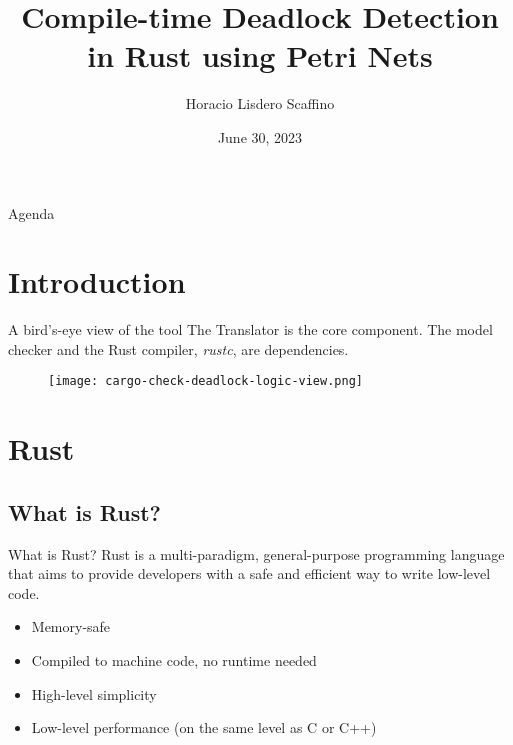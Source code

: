 \documentclass{beamer}
\title[Compile-time Deadlock Detection in Rust]{Compile-time Deadlock Detection \\ in Rust using Petri Nets}
\author{Horacio Lisdero Scaffino}
\institute[FIUBA]{Facultad de Ingeniería\\Universidad de Buenos Aires}
\date{June 30, 2023}
\begin{document}
\begin{frame}
  \titlepage
\end{frame}

\logo{}

\begin{frame}{Agenda}
  \tableofcontents
\end{frame}

\section{Introduction}

\begin{frame}{A bird's-eye view of the tool}
  The Translator is the core component.
  The model checker and the Rust compiler, \emph{rustc}, are dependencies.

  \begin{figure}
    \centering
    \texttt{[image: cargo-check-deadlock-logic-view.png]}
  \end{figure}
\end{frame}

\section{Rust}

\subsection{What is Rust?}

\begin{frame}{What is Rust?}
  Rust is a multi-paradigm, general-purpose programming language that
  aims to provide developers with a safe and efficient way to write low-level code.

  \pause
  \vfill

  \begin{itemize}
    \item Memory-safe
    \item Compiled to machine code, no runtime needed
    \item High-level simplicity
    \item Low-level performance (on the same level as C or C++)
  \end{itemize}
\end{frame}
\end{document}
